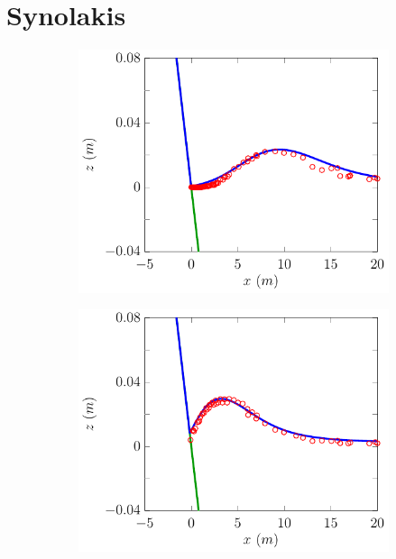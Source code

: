 \section{Synolakis}
\begin{figure}
	\centering
	\begin{subfigure}{0.5\textwidth}
		\includegraphics[width=\textwidth]{./chp6/figures/Experiment/Synolakis/H0p0185/FEVM/30s.pdf}
	\end{subfigure}%
	\begin{subfigure}{0.5\textwidth}
		\includegraphics[width=\textwidth]{./chp6/figures/Experiment/Synolakis/H0p0185/FEVM/40s.pdf}

\end{subfigure}
\end{figure}
